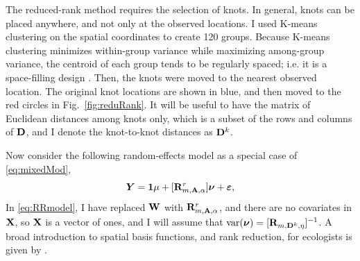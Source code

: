 \documentclass[11pt, titlepage]{article}\usepackage[]{graphicx}\usepackage[]{color}
\begin{document}
\begin{spacing}{1.9}
\begin{flushleft}
The reduced-rank method requires the selection of knots.  In general, knots can be placed anywhere, and not only at the observed locations.  I used K-means clustering \citep{MacQ:some:1967} on the spatial coordinates to create 120 groups. Because K-means clustering minimizes within-group variance while maximizing among-group variance, the centroid of each group tends to be regularly spaced; i.e. it is a space-filling design \citep[e.g.][]{Ver:Jans:esti:2015}.  Then, the knots were moved to the nearest observed location. The original knot locations are shown in blue, and then moved to the red circles in Fig.~\ref{fig:reduRank}.  It will be useful to have the matrix of Euclidean distances among knots only, which is a subset of the rows and columns of $\mathbf{D}$, and I denote the knot-to-knot distances as $\mathbf{D}^k$. 

Now consider the following random-effects model as a special case of \ref{eq:mixedMod},
\begin{equation} \label{eq:RRmodel}
	\bm Y = \mathbf{1}\mu + [\mathbf{R}^r_{m,\mathbf{A},\alpha}]\mbox{\boldmath $\nu$} + \mbox{\boldmath $\varepsilon$},
\end{equation}
In \ref{eq:RRmodel}, I have replaced $\mathbf{W}$ with $\mathbf{R}_{m,\mathbf{A},\alpha}^r$, and there are no covariates in $\mathbf{X}$, so $\mathbf{X}$ is a vector of ones, and I will assume that $\textrm{var}(\mbox{\boldmath $\nu$})=[\mathbf{R}_{m,\mathbf{D}^k,\eta}]^{-1}$.  A broad introduction to spatial basis functions, and rank reduction, for ecologists is given by \citet{Hefl:Brom:Bros:Bude:basi:2016}.


\end{flushleft}
\end{spacing}
\end{document}
